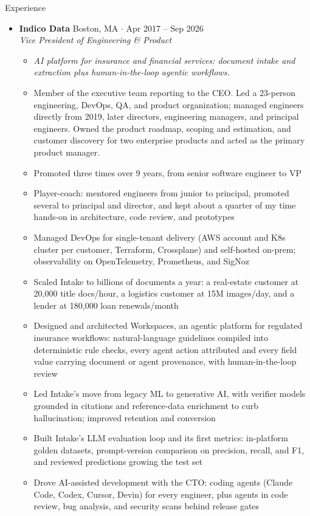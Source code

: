 \documentclass[10pt,oneside]{article}
\newenvironment{ressection}[1]{
  \vspace{4pt}
  {\fontfamily{phv}\selectfont\Large#1}
  \begin{itemize}
    \vspace{3pt}
}{
  \end{itemize}
}
\newcommand{\ressubitem}[1]{
  \vspace{-1pt}
\item \begin{flushleft} #1 \end{flushleft}
}
\newcommand{\rescontext}[1]{
  \vspace{-3pt}
\item[] \begin{flushleft} \textit{\small #1} \end{flushleft}
}
\newcommand{\resscope}[1]{
  \vspace{-3pt}
\item[] \begin{flushleft} #1 \end{flushleft}
}
\newcommand{\resbigitem}[3]{
  \vspace{-5pt}
\item
  \textbf{#1} \hfill #2 \\
  \textit{#3}
}
\newenvironment{ressubsec}[3]{
  \resbigitem{#1}{#2}{#3}
  \vspace{-2pt}
  \begin{itemize}
}{
  \end{itemize}
}
\begin{document}
\begin{ressection}{Experience}

  \begin{ressubsec}{Indico Data}{Boston, MA \; $\cdot$ \; Apr 2017 -- Sep 2026}{Vice President of Engineering \& Product}
    \rescontext{AI platform for insurance and financial services: document intake and extraction plus human-in-the-loop agentic workflows.}
    \resscope{Member of the executive team reporting to the CEO. Led a 23-person engineering, DevOps, QA, and product organization; managed engineers directly from 2019, later directors, engineering managers, and principal engineers. Owned the product roadmap, scoping and estimation, and customer discovery for two enterprise products and acted as the primary product manager.}
    \ressubitem{Promoted three times over 9 years, from senior software engineer to VP}
    \ressubitem{Player-coach: mentored engineers from junior to principal, promoted several to principal and director, and kept about a quarter of my time hands-on in architecture, code review, and prototypes}
    \ressubitem{Managed DevOps for single-tenant delivery (AWS account and K8s cluster per customer, Terraform, Crossplane) and self-hosted on-prem; observability on OpenTelemetry, Prometheus, and SigNoz}
    \ressubitem{Scaled Intake to billions of documents a year: a real-estate customer at 20{,}000 title docs/hour, a logistics customer at 15M images/day, and a lender at 180{,}000 loan renewals/month}
    \ressubitem{Designed and architected Workspaces, an agentic platform for regulated insurance workflows: natural-language guidelines compiled into deterministic rule checks, every agent action attributed and every field value carrying document or agent provenance, with human-in-the-loop review}
    \ressubitem{Led Intake's move from legacy ML to generative AI, with verifier models grounded in citations and reference-data enrichment to curb hallucination; improved retention and conversion}
    \ressubitem{Built Intake's LLM evaluation loop and its first metrics: in-platform golden datasets, prompt-version comparison on precision, recall, and F1, and reviewed predictions growing the test set}
    \ressubitem{Drove AI-assisted development with the CTO: coding agents (Claude Code, Codex, Cursor, Devin) for every engineer, plus agents in code review, bug analysis, and security scans behind release gates}

\end{ressubsec}
\end{ressection}
\end{document}
